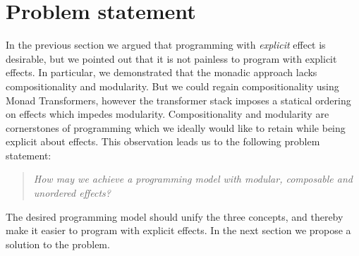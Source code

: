 \section{Problem statement}\label{sec:problem-statement}
In the previous section we argued that programming with \emph{explicit} effect is desirable, but we pointed out that it is not painless to program with explicit effects. In particular, we demonstrated that the monadic approach lacks compositionality and modularity. But we could regain compositionality using Monad Transformers, however the transformer stack imposes a statical ordering on effects which impedes modularity. Compositionality and modularity are cornerstones of programming which we ideally would like to retain while being explicit about effects. This observation leads us to the following problem statement:
\begin{quote}
  \emph{How may we achieve a programming model with modular, composable and unordered effects?}
\end{quote}
The desired programming model should unify the three concepts, and thereby make it easier to program with explicit effects. In the next section we propose a solution to the problem.
